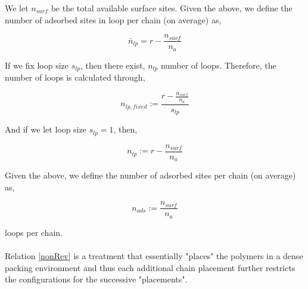 \documentclass[10pt,letterpaper]{article}
\begin{document}
%


\noindent 
We let $n_{surf}$ be the total available surface sites. Given the above, we define the number of adsorbed sites in loop per chain (on average) as,

\begin{equation}
	\boxed{\bar{n}_{lp}=r-\frac{n_{surf}}{n_a}}
	\label{mean nlp}
\end{equation}


\noindent If we fix loop size $s_{lp}$, then there exist, $n_{lp}$ number of loops. Therefore, the number of loops is calculated through,


\begin{equation}
	\boxed{n_{lp,fixed}:= \frac{r-\frac{n_{surf}}{n_a}}{s_{lp}}}
	\label{nlp,Gen}
\end{equation}


\noindent And if we let loop size $s_{lp}=1$, then,


\begin{equation}
\boxed{n_{lp}:= r-\frac{n_{surf}}{n_a}}
\label{nlp}
\end{equation}

%






\noindent Given the above, we define the number of adsorbed sites per chain (on average) as,

\begin{equation}
	\boxed{n_{ads}:= \frac{n_{surf}}{n_a}}
	\label{nads}
\end{equation}




\noindent loops per chain.\\\\


\noindent Relation \ref{nonRev} is a treatment that essentially "places" the polymers in a dense packing environment and thus each additional chain placement further restricts the configurations for the successive "placements". 
\end{document}
